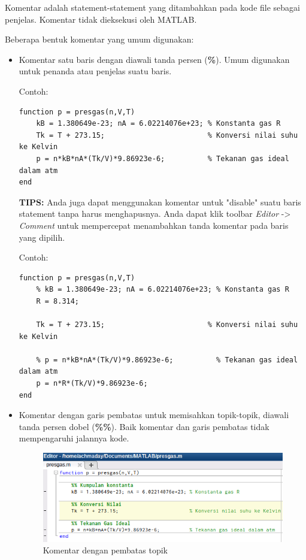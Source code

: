 \documentclass[12pt]{book}
\begin{document}
	Komentar adalah statement-statement yang ditambahkan pada kode file sebagai penjelas.
	Komentar tidak dieksekusi oleh MATLAB.

	Beberapa bentuk komentar yang umum digunakan:
	\begin{itemize}
		\item Komentar satu baris dengan diawali tanda persen (\textbf{\%}).
		Umum digunakan untuk penanda atau penjelas suatu baris.

		Contoh:
		\begin{verbatim}
function p = presgas(n,V,T)
	kB = 1.380649e-23; nA = 6.02214076e+23; % Konstanta gas R
	Tk = T + 273.15;                        % Konversi nilai suhu ke Kelvin
	p = n*kB*nA*(Tk/V)*9.86923e-6;          % Tekanan gas ideal dalam atm
end
		\end{verbatim}

		\textbf{TIPS:} Anda juga dapat menggunakan komentar untuk "disable" suatu baris statement tanpa harus menghapusnya.
		Anda dapat klik toolbar \textit{Editor} -> \textit{Comment} untuk mempercepat menambahkan tanda komentar pada baris yang dipilih.

		Contoh:
		\begin{verbatim}
function p = presgas(n,V,T)
	% kB = 1.380649e-23; nA = 6.02214076e+23; % Konstanta gas R
	R = 8.314;

	Tk = T + 273.15;                        % Konversi nilai suhu ke Kelvin

	% p = n*kB*nA*(Tk/V)*9.86923e-6;          % Tekanan gas ideal dalam atm
	p = n*R*(Tk/V)*9.86923e-6;
end
		\end{verbatim}
		\item Komentar dengan garis pembatas untuk memisahkan topik-topik, diawali tanda persen dobel (\textbf{\%\%}).
		Baik komentar dan garis pembatas tidak mempengaruhi jalannya kode.

		\begin{figure}[!ht]
			\centering
			\includegraphics[width=400pt]{images/komentopik}
			\caption{Komentar dengan pembatas topik}
		\end{figure}
	\end{itemize}
\end{document}
